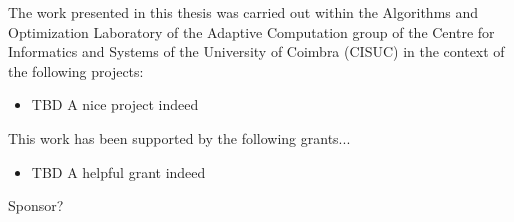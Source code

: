 \thispagestyle{empty}

\vspace*{\fill}

The work presented in this thesis was carried out within the Algorithms and Optimization Laboratory of the Adaptive Computation group of the Centre for Informatics and Systems of the University of Coimbra (CISUC) in the context of the following projects:

\begin{itemize}
    \item{TBD} A nice project indeed
\end{itemize}

This work has been supported by the following grants...

\begin{itemize}
    \item{TBD} A helpful grant indeed
\end{itemize}
\vspace*{\fill}

Sponsor?
\begin{figure}[!hb]
    \centering
\end{figure}

